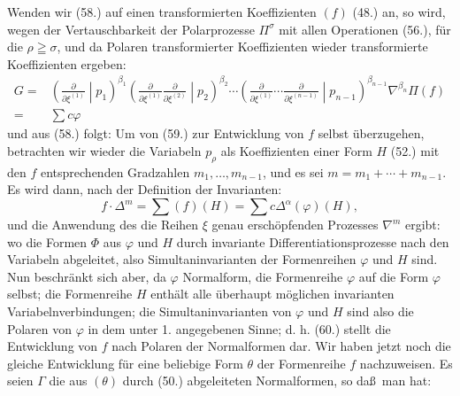 Wenden wir (58.) auf einen transformierten Koeffizienten $(f)$ (48.) an, so wird, wegen der Vertauschbarkeit der Polarprozesse $\Pi^\sigma$ mit allen Operationen (56.), f\"ur die $\rho\geqq\sigma$, und da Polaren transformierter Koeffizienten wieder transformierte Koeffizienten ergeben:
\[
\begin{aligned}
 G={}&\left(\frac{\partial}{\partial\xi^{(1)}}\middle|p_1\right)^{\beta_1}
 \left(\frac{\partial}{\partial\xi^{(1)}}\frac{\partial}{\partial\xi^{(2)}}\middle|p_2\right)^{\beta_2}
 \cdots
 \left(\frac{\partial}{\partial\xi^{(1)}}\cdots\frac{\partial}{\partial\xi^{(n-1)}}\middle|p_{n-1}\right)^{\beta_{n-1}}
 \nabla^{\beta_n}\Pi(f)\\
 ={}&\sum c\varphi
\end{aligned}
\]
und aus (58.) folgt:
Um von (59.) zur Entwicklung von $f$ selbst \"uberzugehen, betrachten wir wieder die Variabeln $p_\rho$ als Koeffizienten einer Form $H$ (52.) mit den $f$ entsprechenden Gradzahlen $m_1,\ldots,m_{n-1}$, und es sei $m=m_1+\cdots+m_{n-1}$. Es wird dann, nach der Definition der Invarianten:
\[
 f\cdot\Delta^m=\sum(f)(H)=\sum c\Delta^\alpha(\varphi)(H),
\]
und die Anwendung des die Reihen $\xi$ genau ersch\"opfenden Prozesses $\nabla^m$ ergibt:
wo die Formen $\Phi$ aus $\varphi$ und $H$ durch invariante Differentiationsprozesse nach den Variabeln abgeleitet, also Simultaninvarianten der Formenreihen $\varphi$ und $H$ sind. Nun beschr\"ankt sich aber, da $\varphi$ Normalform, die Formenreihe $\varphi$ auf die Form $\varphi$ selbst; die Formenreihe $H$ enth\"alt alle \"uberhaupt m\"oglichen invarianten Variabelnverbindungen; die Simultaninvarianten von $\varphi$ und $H$ sind also die Polaren von $\varphi$ in dem unter 1. angegebenen Sinne; d. h. (60.) stellt die Entwicklung von $f$ nach Polaren der Normalformen dar. Wir haben jetzt noch die gleiche Entwicklung f\"ur eine beliebige Form $\theta$ der Formenreihe $f$ nachzuweisen. Es seien $\Gamma$ die aus $(\theta)$ durch (50.) abgeleiteten Normalformen, so da\ss\ man hat:
